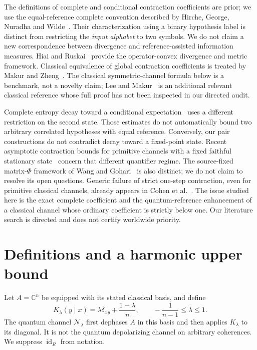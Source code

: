 \documentclass[11pt]{article}
\theoremstyle{remark}\newtheorem{remark}[theorem]{Remark}
\newcommand{\id}{\operatorname{id}}
\newcommand{\N}{\mathcal N}
\begin{document}
The definitions of complete and conditional contraction coefficients are prior; we use the equal-reference complete convention described by Hirche, George, Nuradha and Wilde~\cite{HGNW}. Their characterization using a binary hypothesis label is distinct from restricting the \emph{input alphabet} to two symbols. We do not claim a new correspondence between divergence and reference-assisted information measures. Hiai and Ruskai~\cite{HR} provide the operator-convex divergence and metric framework. Classical equivalence of global contraction coefficients is treated by Makur and Zheng~\cite{MZ}. The classical symmetric-channel formula below is a benchmark, not a novelty claim; Lee and Makur~\cite{LM} is an additional relevant classical reference whose full proof has not been inspected in our directed audit.

Complete entropy decay toward a conditional expectation~\cite{GR,GJLL} uses a different restriction on the second state. Those estimates do not automatically bound two arbitrary correlated hypotheses with equal reference. Conversely, our pair constructions do not contradict decay toward a fixed-point state. Recent asymptotic contraction bounds for primitive channels with a fixed faithful stationary state~\cite{TTG} concern that different quantifier regime. The source-fixed matrix-$\Phi$ framework of Wang and Gohari~\cite{WG} is also distinct; we do not claim to resolve its open questions. Generic failure of strict one-step contraction, even for primitive classical channels, already appears in Cohen et al.~\cite{Cohen}. The issue studied here is the exact complete coefficient and the quantum-reference enhancement of a classical channel whose ordinary coefficient is strictly below one. Our literature search is directed and does not certify worldwide priority.

\section{Definitions and a harmonic upper bound}
Let $A=\mathbb C^n$ be equipped with its stated classical basis, and define
\begin{equation}\label{eq:channel}
 K_\lambda(y\mid x)=\lambda\delta_{xy}+\frac{1-\lambda}{n},
 \qquad -\frac1{n-1}\leq\lambda\leq1.
\end{equation}
The quantum channel $\N_\lambda$ first dephases $A$ in this basis and then applies $K_\lambda$ to its diagonal. It is not the quantum depolarizing channel on arbitrary coherences. We suppress $\id_R$ from notation.
\end{document}
